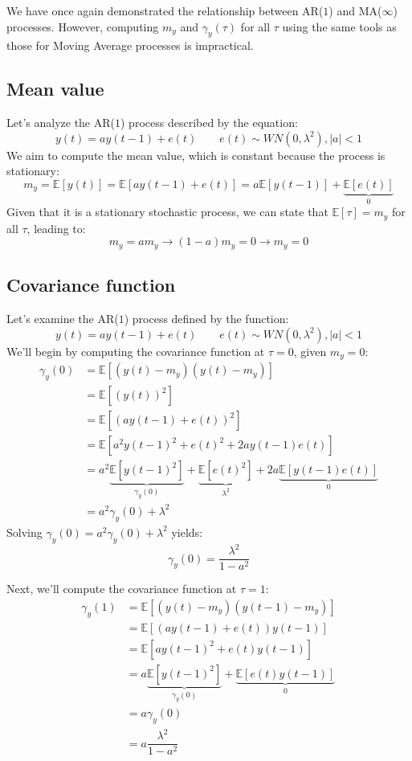 We have once again demonstrated the relationship between AR($1$) and MA($\infty$) processes. 
However, computing $m_y$ and $\gamma_y(\tau)$ for all $\tau$ using the same tools as those for Moving Average processes is impractical.

\subsection{Mean value}
Let's analyze the AR($1$) process described by the equation:
\[y(t)=ay(t-1)+e(t) \qquad e(t)\sim WN(0,\lambda^2),\left\lvert a \right\rvert<1\]
We aim to compute the mean value, which is constant because the process is stationary:
\[m_y=\mathbb{E}\left[y(t)\right]=\mathbb{E}\left[ay(t-1)+e(t)\right]=a\mathbb{E}\left[y(t-1)\right]+\underbrace{\mathbb{E}\left[e(t)\right]}_0\]
Given that it is a stationary stochastic process, we can state that  $\mathbb{E}\left[\tau\right]=m_y$ for all $\tau$, leading to:
\[m_y=am_y\rightarrow (1-a)m_y=0\rightarrow m_y=0\]

\subsection{Covariance function}
Let's examine the AR($1$) process defined by the function:
\[y(t)=ay(t-1)+e(t) \qquad e(t)\sim WN(0,\lambda^2),\left\lvert a \right\rvert<1\]
We'll begin by computing the covariance function at $\tau=0$, given $m_y=0$:
\begin{align*}
    \gamma_y(0) &=\mathbb{E}\left[ \left(y(t)-m_y\right)\left(y(t)-m_y\right) \right] \\
                &=\mathbb{E}\left[ \left(y(t)\right)^2 \right] \\
                &=\mathbb{E}\left[ \left(ay(t-1)+e(t)\right)^2 \right] \\      
                &=\mathbb{E}\left[ a^2y(t-1)^2+e(t)^2+2ay(t-1)e(t) \right] \\     
                &=a^2\underbrace{\mathbb{E}\left[ y(t-1)^2\right]}_{\gamma_y(0)} +\underbrace{\mathbb{E}\left[e(t)^2\right]}_{\lambda^2} +2a\underbrace{\mathbb{E}\left[y(t-1)e(t)\right]}_{0}  \\    
                &=a^2\gamma_y(0) +\lambda^2 
\end{align*}
Solving $\gamma_y(0)=a^2\gamma_y(0) +\lambda^2$ yields:
\[\gamma_y(0)=\dfrac{\lambda^2}{1-a^2}\]

Next, we'll compute the covariance function at $\tau=1$:
\begin{align*}
    \gamma_y(1) &=\mathbb{E}\left[ \left(y(t)-m_y\right)\left(y(t-1)-m_y\right) \right] \\
                &=\mathbb{E}\left[ \left(ay(t-1)+e(t)\right)y(t-1) \right] \\
                &=\mathbb{E}\left[ ay(t-1)^2+e(t)y(t-1) \right] \\     
                &=a\underbrace{\mathbb{E}\left[ y(t-1)^2\right]}_{\gamma_y(0)} +\underbrace{\mathbb{E}\left[ e(t)y(t-1) \right]}_0  \\  
                &=a\gamma_y(0) \\
                &=a\dfrac{\lambda^2}{1-a^2}
\end{align*}

